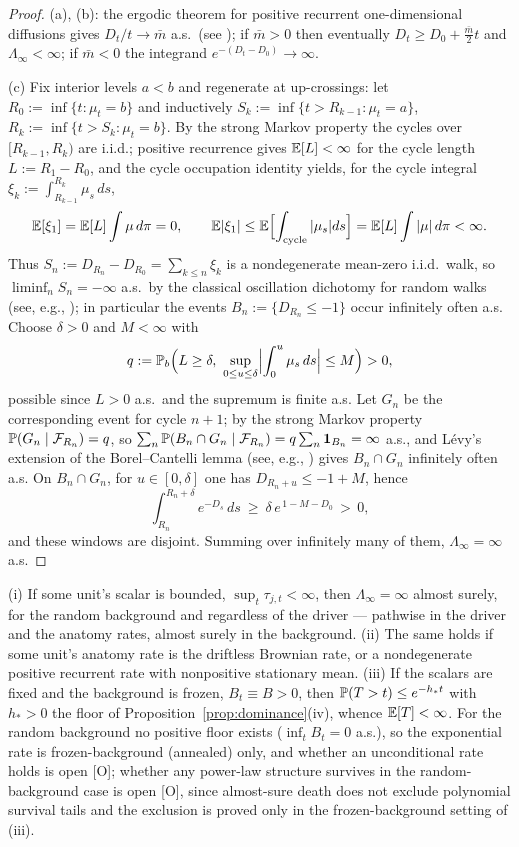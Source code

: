 \begin{proof}
(a), (b): the ergodic theorem for positive recurrent one-dimensional
diffusions gives $D_t/t\to\bar m$ a.s.\ (see \cite[Ch.~X]{RY99}); if
$\bar m>0$ then eventually $D_t\ge D_0+\tfrac{\bar m}2t$ and
$\Lambda_\infty<\infty$; if $\bar m<0$ the integrand
$e^{-(D_t-D_0)}\to\infty$.

(c) Fix interior levels $a<b$ and regenerate at up-crossings: let
$R_0:=\inf\{t:\mu_t=b\}$ and inductively
$S_k:=\inf\{t>R_{k-1}:\mu_t=a\}$, $R_k:=\inf\{t>S_k:\mu_t=b\}$. By the
strong Markov property the cycles over $[R_{k-1},R_k)$ are i.i.d.; positive
recurrence gives $\mathbb{E}[L]<\infty$ for the cycle length
$L:=R_1-R_0$, and the cycle occupation identity yields, for the cycle
integral $\xi_k:=\int_{R_{k-1}}^{R_k}\mu_s\,ds$,
\[
\mathbb{E}[\xi_1]=\mathbb{E}[L]\int\mu\,d\pi=0,\qquad
\mathbb{E}|\xi_1|\le\mathbb{E}\Bigl[\int_{\text{cycle}}|\mu_s|ds\Bigr]
=\mathbb{E}[L]\int|\mu|\,d\pi<\infty .
\]
Thus $S_n:=D_{R_n}-D_{R_0}=\sum_{k\le n}\xi_k$ is a nondegenerate mean-zero
i.i.d.\ walk, so $\liminf_nS_n=-\infty$ a.s.\ by the classical
oscillation dichotomy for random walks (see, e.g., \cite{Dur19});
in particular the events $B_n:=\{D_{R_n}\le-1\}$ occur infinitely often
a.s. Choose $\delta>0$ and $M<\infty$ with
\[
q:=\mathbb{P}_b\Bigl(L\ge\delta,\ \sup_{0\le u\le\delta}
\Bigl|\int_0^u\mu_s\,ds\Bigr|\le M\Bigr)>0,
\]
possible since $L>0$ a.s.\ and the supremum is finite a.s. Let
$G_n$ be the corresponding event for cycle $n{+}1$; by the strong Markov
property $\mathbb{P}(G_n\mid\mathcal{F}_{R_n})=q$, so
$\sum_n\mathbb{P}(B_n\cap G_n\mid\mathcal{F}_{R_n})=q\sum_n\mathbf{1}_{B_n}=\infty$ a.s., and
L\'evy's extension of the Borel--Cantelli lemma (see, e.g.,
\cite{Dur19}) gives
$B_n\cap G_n$ infinitely often a.s. On $B_n\cap G_n$, for
$u\in[0,\delta]$ one has $D_{R_n+u}\le-1+M$, hence
\[
\int_{R_n}^{R_n+\delta}e^{-D_s}\,ds\ \ge\ \delta\,e^{\,1-M-D_0}\,>\,0 ,
\]
and these windows are disjoint. Summing over infinitely many of them,
$\Lambda_\infty=\infty$ a.s.
\end{proof}

\begin{theorem}
\label{thm:trapped}
(i) If some unit's scalar is bounded, $\sup_t\tau_{j,t}<\infty$, then
$\Lambda_\infty=\infty$ almost surely, for the random background and
regardless of the driver --- pathwise in the driver and the anatomy
rates, almost surely in the background. (ii) The same holds if some
unit's anatomy rate is the driftless Brownian rate, or a nondegenerate
positive recurrent rate with nonpositive stationary mean. (iii) If the
scalars are fixed and the background is frozen, $B_t\equiv B>0$, then
$\mathbb{P}(T>t)\le e^{-h_\ast t}$ with $h_\ast>0$ the floor of
Proposition~\ref{prop:dominance}(iv), whence $\mathbb{E}[T]<\infty$. For the
random background no positive floor exists ($\inf_tB_t=0$ a.s.), so the
exponential rate is frozen-background (annealed) only, and whether an
unconditional rate holds is open [O]; whether any power-law structure
survives in the random-background case is open [O], since almost-sure
death does not exclude polynomial survival tails and the exclusion is
proved only in the frozen-background setting of (iii).
\end{theorem}

